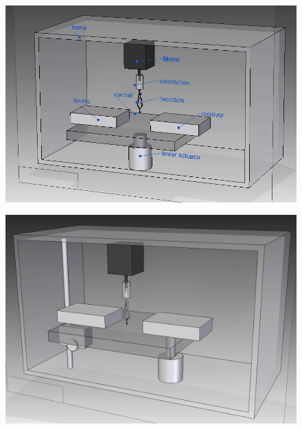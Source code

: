 \documentclass{article}
\begin{document}
\begin{figure}[h]
  \centering
  \includegraphics[width=\linewidth]{../img/render1}
  \label{fig:render1}
\end{figure}

\begin{figure}[h]
  \centering
  \includegraphics[width=\linewidth]{../img/render2}
  \label{fig:render2}
\end{figure}
\end{document}
